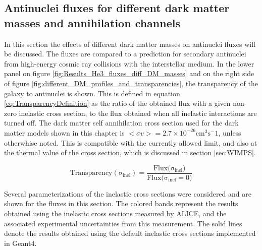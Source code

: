 \subsection{Antinuclei fluxes for different dark matter masses and annihilation channels}
In this section the effects of different dark matter masses on antinuclei fluxes will be discussed. The fluxes are compared to a prediction for secondary antinuclei from high-energy cosmic ray collisions with the interstellar medium. In the lower panel on figure \ref{fig:Results_He3_fluxes_diff_DM_masses} and  on the right side of figure \ref{fig:different_DM_profiles_and_transparencies}, the transparency of the galaxy to antinuclei is shown. This is defined in equation \ref{eq:TransparencyDefinition} as the ratio of the obtained flux with a given non-zero inelastic cross section, to the flux obtained when all inelastic interactions are turned off. The dark matter self annihilation cross section used for the dark matter models shown in this chapter is $<\sigma v>=2.7 \times 10^{-26}$cm$^3 \mathrm{s}^-1$, unless otherwhise noted. This is compatible with the currently allowed limit, and also at the thermal value of the cross section, which is discussed in section \ref{sec:WIMPS}. 

\begin{equation}\label{eq:TransparencyDefinition}
    \mathrm{Transparency(\sigma_{inel})} = \frac{\mathrm{Flux(\sigma_{inel}})}{\mathrm{Flux(\sigma_{inel}=0})} 
\end{equation}

Several parameterizations of the inelastic cross sections were considered and are shown for the fluxes in this section. The colored bands represent the results obtained using the inelastic cross sections measured by ALICE, and the associated experimental uncertainties from this measurement. The solid lines denote the results obtained using the default inelastic cross sections implemented in Geant4. 

